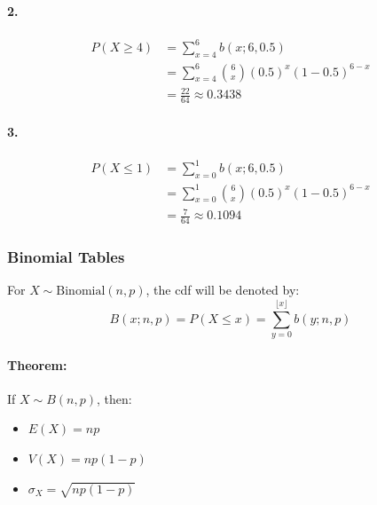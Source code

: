 \paragraph*{2.}
\begin{align*}
    P(X \geq 4) &= \sum_{x=4}^{6} b(x; 6, 0.5) \\
    &= \sum_{x=4}^{6} \binom{6}{x} (0.5)^x (1-0.5)^{6-x} \\
    &= \frac{22}{64} \approx 0.3438
\end{align*}

\paragraph*{3.}
\begin{align*}
    P(X \leq 1) &= \sum_{x=0}^{1} b(x; 6, 0.5) \\
    &= \sum_{x=0}^{1} \binom{6}{x} (0.5)^x (1-0.5)^{6-x} \\
    &= \frac{7}{64} \approx 0.1094
\end{align*}

\subsubsection*{Binomial Tables}
For $X \sim \text{Binomial}(n, p)$, the cdf will be denoted by:
\[
    B(x; n, p) = P(X \leq x) = \sum_{y=0}^{\lfloor x \rfloor} b(y; n, p)
\]

\paragraph*{Theorem:}
If $X \sim B(n,p)$, then:
\begin{itemize}
    \item $E(X) = np$
    \item $V(X) = np(1-p)$
    \item $\sigma_X = \sqrt{np(1-p)}$
\end{itemize}
